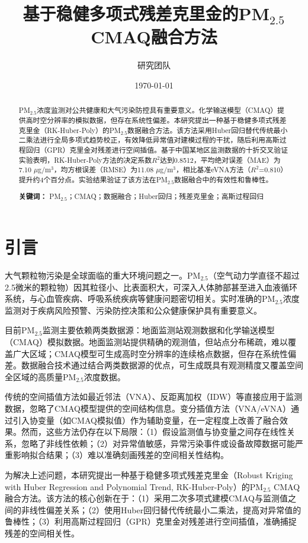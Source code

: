 \documentclass[UTF8, a4paper, 12pt]{article}
\title{基于稳健多项式残差克里金的PM$_{2.5}$ CMAQ融合方法}
\author{研究团队}
\date{\today}
\begin{document}
\maketitle

\begin{abstract}
PM$_{2.5}$浓度监测对公共健康和大气污染防控具有重要意义。化学输送模型（CMAQ）提供高时空分辨率的模拟数据，但存在系统性偏差。本研究提出一种基于稳健多项式残差克里金（RK-Huber-Poly）的PM$_{2.5}$数据融合方法。该方法采用Huber回归替代传统最小二乘法进行全局多项式趋势校正，有效降低异常值对建模过程的干扰，随后利用高斯过程回归（GPR）克里金对残差进行空间插值。基于中国某地区监测数据的十折交叉验证实验表明，RK-Huber-Poly方法的决定系数$R^2$达到0.8512，平均绝对误差（MAE）为7.10 $\mu$g/m$^3$，均方根误差（RMSE）为11.08 $\mu$g/m$^3$，相比基准eVNA方法（$R^2$=0.810）提升约4个百分点。实验结果验证了该方法在PM$_{2.5}$数据融合中的有效性和鲁棒性。

\textbf{关键词：} PM$_{2.5}$；CMAQ；数据融合；Huber回归；残差克里金；高斯过程回归
\end{abstract}

\section{引言}

大气颗粒物污染是全球面临的重大环境问题之一。PM$_{2.5}$（空气动力学直径不超过2.5微米的颗粒物）因其粒径小、比表面积大，可深入人体肺部甚至进入血液循环系统，与心血管疾病、呼吸系统疾病等健康问题密切相关。实时准确的PM$_{2.5}$浓度监测对于疾病风险预警、污染防控决策和公众健康保护具有重要意义。

目前PM$_{2.5}$监测主要依赖两类数据源：地面监测站观测数据和化学输送模型（CMAQ）模拟数据。地面监测站提供精确的观测值，但站点分布稀疏，难以覆盖广大区域；CMAQ模型可生成高时空分辨率的连续格点数据，但存在系统性偏差。数据融合技术通过结合两类数据源的优点，可生成既具有观测精度又覆盖空间全区域的高质量PM$_{2.5}$浓度数据。

传统的空间插值方法如最近邻法（VNA）、反距离加权（IDW）等直接应用于监测数据，忽略了CMAQ模型提供的空间结构信息。变分插值方法（VNA/eVNA）通过引入协变量（如CMAQ模拟值）作为辅助变量，在一定程度上改善了融合效果。然而，这些方法仍存在以下局限：（1）假设监测值与协变量之间存在线性关系，忽略了非线性依赖；（2）对异常值敏感，异常污染事件或设备故障数据可能严重影响拟合结果；（3）难以准确刻画残差的空间相关性结构。

为解决上述问题，本研究提出一种基于稳健多项式残差克里金（Robust Kriging with Huber Regression and Polynomial Trend, RK-Huber-Poly）的PM$_{2.5}$ CMAQ融合方法。该方法的核心创新在于：（1）采用二次多项式建模CMAQ与监测值之间的非线性偏差关系；（2）使用Huber回归替代传统最小二乘法，提高对异常值的鲁棒性；（3）利用高斯过程回归（GPR）克里金对残差进行空间插值，准确捕捉残差的空间相关性。
\end{document}
